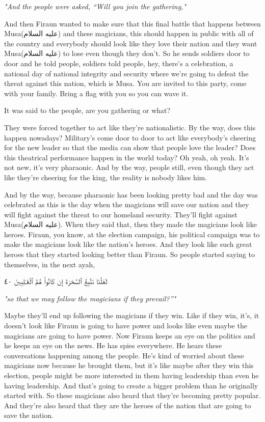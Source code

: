 \documentclass[12pt]{article}
\newcommand{\as}{\textarabic{(عليه السلام)}}
\begin{document}
\textit{"And the people were asked, “Will you join the gathering,"}

And then Firaun wanted to make sure that this final battle that happens between Musa\as{} and these magicians, this should happen in public with all of the country and everybody should look like they love their nation and they want Musa\as{} to lose even though they don't. So he sends soldiers door to door and he told people, soldiers told people, hey, there's a celebration, a national day of national integrity and security where we're going to defeat the threat against this nation, which is Musa. You are invited to this party, come with your family. Bring a flag with you so you can wave it. 

It was said to the people, are you gathering or what? 

They were forced together to act like they're nationalistic. By the way, does this happen nowadays? Military's come door to door to act like everybody's cheering for the new leader so that the media can show that people love the leader? Does this theatrical performance happen in the world today? Oh yeah, oh yeah. It's not new, it's very pharaonic. And by the way, people still, even though they act like they're cheering for the king, the reality is nobody likes him. 

And by the way, because pharaonic has been looking pretty bad and the day was celebrated as this is the day when the magicians will save our nation and they will fight against the threat to our homeland security. They'll fight against Musa\as{}. When they said that, then they made the magicians look like heroes. Firaun, you know, at the election campaign, his political campaign was to make the magicians look like the nation's heroes. And they look like such great heroes that they started looking better than Firaun. So people started saying to themselves, in the next ayah, 

\textarabic{لَعَلَّنَا نَتَّبِعُ ٱلسَّحَرَةَ إِن كَانُوا۟ هُمُ ٱلْغَـٰلِبِينَ ٤٠}

\textit{"so that we may follow the magicians if they prevail?”"}

Maybe they'll end up following the magicians if they win. Like if they win, it's, it doesn't look like Firaun is going to have power and looks like even maybe the magicians are going to have power. Now Firaun keeps an eye on the politics and he keeps an eye on the news. He has spies everywhere. He hears these conversations happening among the people. He's kind of worried about these magicians now because he brought them, but it's like maybe after they win this election, people might be more interested in them having leadership than even he having leadership. And that's going to create a bigger problem than he originally started with. So these magicians also heard that they're becoming pretty popular. And they're also heard that they are the heroes of the nation that are going to save the nation. 
\end{document}
